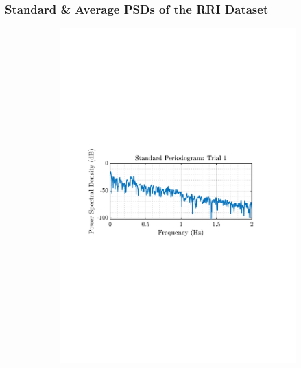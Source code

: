 \documentclass[12pt]{article}
\begin{document}
	\subsubsection{Standard \& Average PSDs of the RRI Dataset}
	\begin{figure}[H]
		\centering
		\begin{subfigure}{0.49\textwidth}
			\centering
			\includegraphics[trim={2.2cm 11cm 3.15cm  11.2cm}, clip, width=\textwidth]{../MATLAB/figures/q1_5a_fig01.pdf} 
		\end{subfigure}
		\begin{subfigure}{0.49\textwidth}
			\centering

\end{subfigure}
\end{figure}
\end{document}
